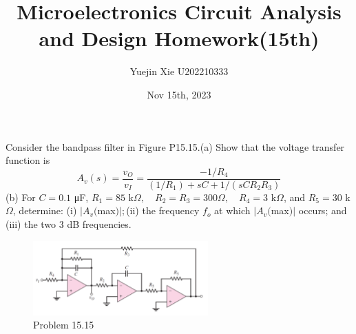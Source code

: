 \documentclass[a4paper,11pt,UTF8]{article}
\title{Microelectronics Circuit Analysis and Design Homework(15th)}
\author{Yuejin Xie \quad U202210333}
\date{Nov 15th, 2023}
\begin{document}
 Consider the bandpass filter in Figure P15.15.(a) Show that the voltage transfer function is
$$
A_v(s)=\frac{v_O}{v_I}=\frac{-1/R_4}{(1/R_1)+sC+1/(sCR_2R_3)}
$$
(b) For $C= 0.1$ μF, $R_1=85$ k$\Omega,\quad R_2=R_3=300\Omega,\quad R_4=3$ k$\Omega$, and
$R_5=30$ k$\Omega$, determine: (i) $|A_v( $max$) |; $(ii) the frequency $f_o$ at which $|A_v( $max$) |$ occurs; and (iii) the two 3 dB frequencies.
\begin{figure}[H]
	\centering
	\includegraphics[width=0.6\textwidth]{15.15}
	\caption{Problem 15.15}
\end{figure}
\end{document}
